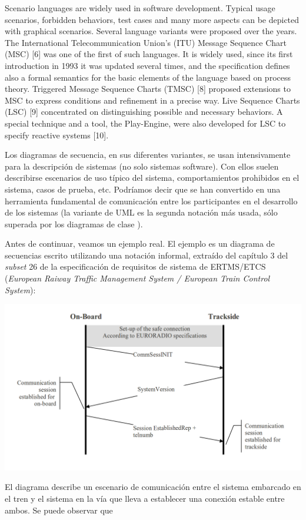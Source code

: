Scenario languages are widely used in software development. Typical
usage scenarios, forbidden behaviors, test cases and many more aspects
can be depicted with graphical scenarios. Several language variants
were proposed over the years. The International Telecommunication
Union’s (ITU) Message Sequence Chart (MSC) [6] was one of the first of
such languages. It is widely used, since its first introduction in
1993 it was updated several times, and the specification defines also
a formal semantics for the basic elements of the language based on
process theory. Triggered Message Sequence Charts (TMSC) [8] proposed
extensions to MSC to express conditions and refinement in a precise
way. Live Sequence Charts (LSC) [9] concentrated on distinguishing
possible and necessary behaviors. A special technique and a tool, the
Play-Engine, were also developed for LSC to specify reactive systems
[10].

Los diagramas de secuencia, en sus diferentes variantes, se usan
intensivamente para la descripción de sistemas (no solo sistemas
software). Con ellos suelen describirse escenarios de uso típico del
sistema, comportamientos prohibidos en el sistema, casos de prueba,
etc. Podríamos decir que se han convertido en una herramienta
fundamental de comunicación entre los participantes en el desarrollo
de los sistemas (la variante de UML es la segunda notación más usada,
sólo superada por los diagramas de clase
\cite{Dobing:2006:UU:1125944.1125949}).

Antes de continuar, veamos un ejemplo real. El ejemplo es un diagrama
de secuencias escrito utilizando una notación informal, extraído del
capítulo 3 del \emph{subset} 26 de la especificación de requisitos de
sistema de ERTMS/ETCS (\emph{European Raiway Traffic Management System /
  European Train Control System}):
\begin{center}
  \includegraphics[width=0.9\linewidth]{images/ejemplo-ertms}
\end{center}
El diagrama describe un escenario de comunicación entre el sistema
embarcado en el tren y el sistema en la vía que lleva a establecer una
conexión estable entre ambos. Se puede observar que 

